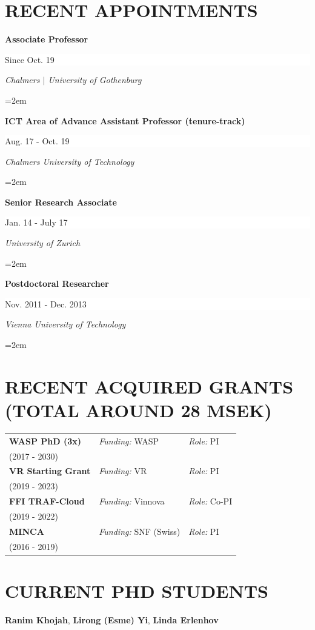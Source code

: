 \documentclass[paper=letter,fontsize=11pt]{scrartcl} %
\newcommand{\NewPart}[2]{\section*{\uppercase{#1} #2}}
\newcommand{\EducationEntry}[4]{
		\noindent \textbf{#1} \hfill      %
		\colorbox{White}{%
			\parbox{10em}{%
			\hfill\color{Black}#2}} \par  %
		\noindent \textit{#3} \par        %
		\noindent\hangindent=2em\hangafter=0 \small #4 %
		\normalsize \par}
\begin{document}
\NewPart{Recent Appointments}{}
\EducationEntry{Associate Professor}{Since Oct. 19}{Chalmers $|$ University of Gothenburg}{}
\EducationEntry{ICT Area of Advance Assistant Professor (tenure-track)}{Aug. 17 - Oct. 19}{Chalmers University of Technology}{}
\EducationEntry{Senior Research Associate}{Jan. 14 - July 17}{University of
Zurich}{}
\EducationEntry{Postdoctoral Researcher}{Nov. 2011 - Dec. 2013}{Vienna
University of Technology}{}

\NewPart{Recent Acquired Grants (total around 28 MSEK)}{}

\renewcommand{\arraystretch}{0.75}
  \begin{tabular}{p{4.8cm}ll}
      \textbf{WASP PhD (3x)} & \emph{Funding:} WASP & \emph{Role:} PI \\
    (2017 - 2030) & & \\	
      \textbf{VR Starting Grant} & \emph{Funding:} VR & \emph{Role:} PI \\
    (2019 - 2023) & & \\
        \textbf{FFI TRAF-Cloud} & \emph{Funding:} Vinnova & \emph{Role:} Co-PI \\
    (2019 - 2022) & & \\	
      \textbf{MINCA} & \emph{Funding:} SNF (Swiss) & \emph{Role:} PI \\
    (2016 - 2019) & & \\
  \end{tabular}

  \NewPart{Current PhD Students}{}

  \textbf{Ranim Khojah}, \textbf{Lirong (Esme) Yi}, \textbf{Linda Erlenhov}

%
%
\end{document}
